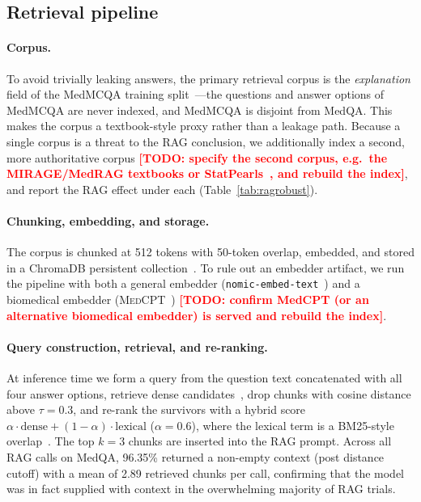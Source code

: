 \documentclass[11pt,a4paper]{article}
\newcommand{\TODO}[1]{\textcolor{red}{\textbf{[TODO: #1]}}}
\begin{document}
\subsection{Retrieval pipeline}
\label{sec:retrieval}

\paragraph{Corpus.} To avoid trivially leaking answers, the primary retrieval
corpus is the \emph{explanation} field of the MedMCQA training
split~\cite{pal2022medmcqa}---the questions and answer options of MedMCQA are
never indexed, and MedMCQA is disjoint from MedQA. This makes the corpus a
textbook-style proxy rather than a leakage path. Because a single corpus is a
threat to the RAG conclusion, we additionally index a second, more
authoritative corpus \TODO{specify the second corpus, e.g.\ the MIRAGE/MedRAG
textbooks or StatPearls~\cite{xiong2024benchmarkingrag}, and rebuild the index},
and report the RAG effect under each (Table~\ref{tab:ragrobust}).

\paragraph{Chunking, embedding, and storage.} The corpus is chunked at 512
tokens with 50-token overlap, embedded, and stored in a ChromaDB persistent
collection~\cite{chromadb}. To rule out an embedder artifact, we run the pipeline
with both a general embedder (\texttt{nomic-embed-text}~\cite{nomic2024embed})
and a biomedical embedder (\textsc{MedCPT}~\cite{jin2023medcpt}) \TODO{confirm
MedCPT (or an alternative biomedical embedder) is served and rebuild the index}.

\paragraph{Query construction, retrieval, and re-ranking.} At inference time we
form a query from the question text concatenated with all four answer
options, retrieve dense candidates~\cite{karpukhin2020dpr}, drop chunks with
cosine distance above $\tau{=}0.3$, and re-rank the survivors with a hybrid score
$\alpha \cdot \text{dense} + (1-\alpha) \cdot \text{lexical}$ ($\alpha{=}0.6$),
where the lexical term is a BM25-style overlap~\cite{robertson2009bm25}. The top
$k{=}3$ chunks are inserted into the RAG prompt. Across all RAG calls on MedQA,
96.35\% returned a non-empty context (post distance cutoff) with a mean of 2.89
retrieved chunks per call, confirming that the model was in fact supplied with
context in the overwhelming majority of RAG trials.
\end{document}
